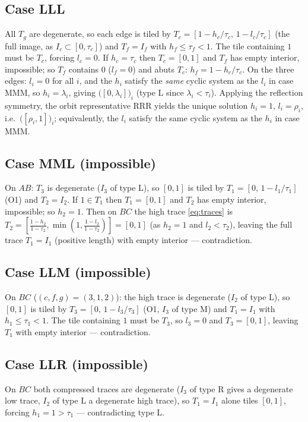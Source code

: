 \documentclass{aims}
\numberwithin{equation}{section}
\theoremstyle{plain}
\theoremstyle{definition}
\theoremstyle{remark}
\begin{document}
\subsection*{Case LLL}
All $T_g$ are degenerate, so each edge is tiled by
$T_c=[1-h_c/\tau_c,\,1-l_c/\tau_c]$ (the full image, as $I_c\subset[0,\tau_c]$)
and $T_f=I_f$ with $h_f\le\tau_f<1$. The tile containing $1$ must be $T_c$,
forcing $l_c=0$. If $h_c=\tau_c$ then $T_c=[0,1]$ and $T_f$ has empty interior,
impossible; so $T_f$ contains $0$ ($l_f=0$) and abuts $T_c$:
$h_f=1-h_c/\tau_c$. On the three edges: $l_i=0$ for all $i$, and the $h_i$
satisfy the \emph{same} cyclic system as the $l_i$ in case MMM, so
$h_i=\lambda_i$, giving $\bigl([0,\lambda_i]\bigr)_i$ (type $\mathrm L$ since
$\lambda_i<\tau_i$). Applying the reflection symmetry, the orbit representative
RRR yields the unique solution $h_i=1$, $l_i=\rho_i$, i.e.\
$\bigl([\rho_i,1]\bigr)_i$; equivalently, the $l_i$ satisfy the same cyclic
system as the $h_i$ in case MMM.

\subsection*{Case MML \textup(impossible\textup)}
On $AB$: $T_3$ is degenerate ($I_3$ of type $\mathrm L$), so $[0,1]$ is tiled
by $T_1=[0,\,1-l_1/\tau_1]$ (O1) and $T_2=I_2$. If $1\in T_1$ then $T_1=[0,1]$
and $T_2$ has empty interior, impossible; so $h_2=1$. Then on $BC$ the high
trace \eqref{eq:traces} is
$T_2=[\tfrac{1-h_2}{1-\tau_2},\min(1,\tfrac{1-l_2}{1-\tau_2})]=[0,1]$ (as
$h_2=1$ and $l_2<\tau_2$), leaving the full trace $T_1=I_1$ (positive length)
with empty interior --- contradiction.

\subsection*{Case LLM \textup(impossible\textup)}
On $BC$ ($(c,f,g)=(3,1,2)$): the high trace is degenerate ($I_2$ of type
$\mathrm L$), so $[0,1]$ is tiled by $T_3=[0,\,1-l_3/\tau_3]$ (O1, $I_3$ of
type $\mathrm M$) and $T_1=I_1$ with $h_1\le\tau_1<1$. The tile containing $1$
must be $T_3$, so $l_3=0$ and $T_3=[0,1]$, leaving $T_1$ with empty interior
--- contradiction.

\subsection*{Case LLR \textup(impossible\textup)}
On $BC$ both compressed traces are degenerate ($I_3$ of type $\mathrm R$ gives
a degenerate low trace, $I_2$ of type $\mathrm L$ a degenerate high trace), so
$T_1=I_1$ alone tiles $[0,1]$, forcing $h_1=1>\tau_1$ --- contradicting type
$\mathrm L$.
\end{document}

